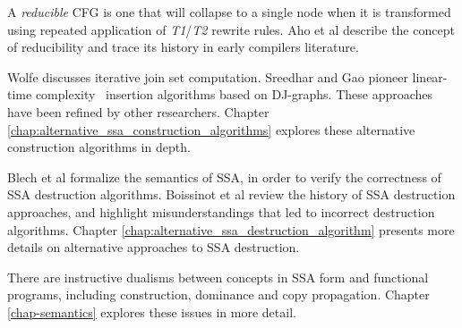 A \textit{reducible} CFG is one that will collapse to a single node when 
it is transformed using repeated application of \emph{T1}/\emph{T2}
rewrite rules.
Aho et al \cite{aho86compilers} describe the concept of reducibility
and trace its history in early compilers literature.

Wolfe \cite{wolfe94j} discusses iterative join set computation.
Sreedhar and Gao \cite{sreedhar95linear} pioneer
linear-time complexity 
\phifun\ insertion
algorithms based on DJ-graphs.
These approaches have been refined by other researchers.
Chapter \ref{chap:alternative_ssa_construction_algorithms}
explores these alternative construction algorithms in depth.


Blech et al \cite{blech05optimizing}
formalize the semantics of SSA, in order to verify
the correctness of SSA destruction algorithms.
Boissinot et al \cite{boissinot09revisiting} review the history of SSA destruction approaches,
and highlight misunderstandings that led to incorrect destruction
algorithms.
Chapter \ref{chap:alternative_ssa_destruction_algorithm} presents
more details on alternative approaches to SSA destruction.

There are instructive dualisms between concepts in SSA form
and
functional programs, including construction, dominance and
copy propagation. Chapter \ref{chap-semantics} explores these issues
in more detail.



